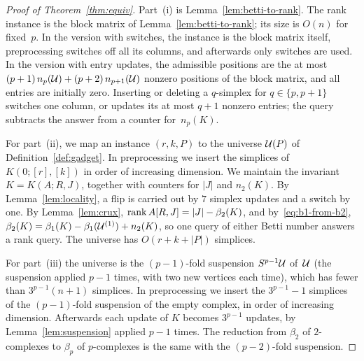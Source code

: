 \begin{proof}[Proof of Theorem~\ref{thm:equiv}]
Part~(i) is Lemma~\ref{lem:betti-to-rank}.
The rank instance is the block matrix of Lemma~\ref{lem:betti-to-rank}; its size is $O(n)$ for fixed~$p$.
In the version with switches, the instance is the block matrix itself, preprocessing switches off all its columns, and afterwards only switches are used.
In the version with entry updates, the admissible positions are the at most ${(p+1)\,n_p(\mathcal{U})}+{(p+2)\,n_{p+1}(\mathcal{U})}$ nonzero positions of the block matrix, and all entries are initially zero.
Inserting or deleting a $q$-simplex for $q\in\{p,p+1\}$ switches one column, or updates its at most $q+1$ nonzero entries; the query subtracts the answer from a counter for~$n_p(K)$.

For part~(ii), we map an instance $(r,k,P)$ to the universe $\mathcal{U}(P)$ of Definition~\ref{def:gadget}.
In preprocessing we insert the simplices of $K(0;[r],[k])$ in order of increasing dimension.
We maintain the invariant $K=K(A;R,J)$, together with counters for $|J|$ and $n_2(K)$.
By Lemma~\ref{lem:locality}, a flip is carried out by $7$ simplex updates and a switch by one.
By Lemma~\ref{lem:crux}, $\operatorname{rank} A[R,J]=|J|-\beta_2(K)$, and by~\eqref{eq:b1-from-b2}, $\beta_2(K)=\beta_1(K)-\beta_1(\mathcal{U}^{(1)})+n_2(K)$, so one query of either Betti number answers a rank query.
The universe has $O(r+k+|P|)$ simplices.

For part~(iii) the universe is the $(p-1)$-fold suspension $S^{p-1}\mathcal{U}$ of~$\mathcal{U}$ (the suspension applied $p-1$ times, with two new vertices each time), which has fewer than $3^{p-1}(n+1)$ simplices.
In preprocessing we insert the $3^{p-1}-1$ simplices of the $(p-1)$-fold suspension of the empty complex, in order of increasing dimension.
Afterwards each update of $K$ becomes $3^{p-1}$ updates, by Lemma~\ref{lem:suspension} applied $p-1$ times.
The reduction from $\beta_2$ of $2$-complexes to $\beta_p$ of $p$-complexes is the same with the $(p-2)$-fold suspension.


\end{proof}
